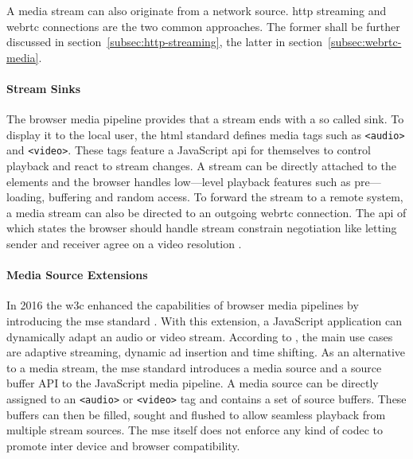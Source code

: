 A media stream can also originate from a network source. \Gls{http} streaming and \gls{webrtc} connections are the two common approaches. The former shall be further discussed in section~\ref{subsec:http-streaming}, the latter in section~\ref{subsec:webrtc-media}.

\paragraph{Stream Sinks}

The browser media pipeline provides that a stream ends with a so called sink. To display it to the local user, the \gls{html} standard \cite[\S4.7]{html-w3c} defines media tags such as \lstinline|<audio>| and \lstinline|<video>|. These tags feature a JavaScript \gls{api} for themselves to control playback and react to stream changes. A stream can be directly attached to the elements and the browser handles low—level playback features such as pre—loading, buffering and random access. To forward the stream to a remote system, a media stream can also be directed to an outgoing \gls{webrtc} connection. The \gls{api} of which states the browser should handle stream constrain negotiation like letting sender and receiver agree on a video resolution \cite[\S5.1]{webrtc-w3c}.

\paragraph{Media Source Extensions}

In 2016 the \gls{w3c} enhanced the capabilities of browser media pipelines by introducing the \gls{mse} standard \cite{TODO}. With this extension, a JavaScript application can dynamically adapt an audio or video stream. According to \cite{mse-google}, the main use cases are adaptive streaming, dynamic ad insertion and time shifting. As an alternative to a media stream, the \gls{mse} standard introduces a media source and a source buffer API to the JavaScript media pipeline. A media source can be directly assigned to an \lstinline|<audio>| or \lstinline|<video>| tag and contains a set of source buffers. These buffers can then be filled, sought and flushed to allow seamless playback from multiple stream sources. The \gls{mse} itself does not enforce any kind of codec to promote inter device and browser compatibility.

